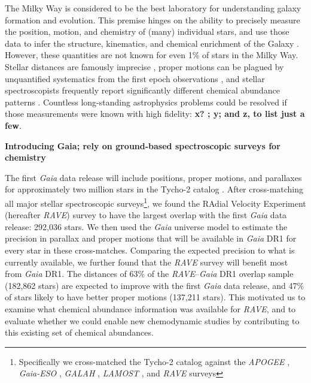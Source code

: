 \documentclass[preprint,trackchanges]{aastex}
\newcommand{\project}[1]{\textsl{#1}}
\newcommand{\acronym}[1]{{\small{#1}}}
\newcommand{\rave}{\project{\acronym{RAVE}}}
\newcommand{\stub}[1]{\textbf{#1}}
\begin{document}
The Milky Way is considered to be the best laboratory for understanding galaxy
formation and evolution.  This premise hinges on the ability to precisely measure 
the position, motion, and chemistry of (many) individual stars, and use those data 
to infer the structure, kinematics, and chemical enrichment of the Galaxy 
\citep[e.g.,][]{Deason_2011,Ness_2012,Ness_2013a,Ness_2013b,Casey_2012,Casey_2013,
Casey_2014a,Casey_2014b}.  %
However, these quantities are not known for even 1\% of stars in the Milky Way.  
Stellar distances are famously imprecise \citep[e.g.,][]{van_Leeuwen_2007,
Jofre_2015,Madler_2016}, proper motions can be plagued by unquantified systematics
from the first epoch observations \citep[e.g.,][]{Casey_Schlaufman_2015}, and 
stellar spectroscopists frequently report significantly different chemical 
abundance patterns \citep{Smiljanic_2014}.  Countless long-standing astrophysics
problems could be resolved if those measurements were known with high fidelity: 
\stub{x? \citep{someone}; y; and z, to list just a few}.


\stub{Introducing Gaia; rely on ground-based spectroscopic surveys for chemistry}

The first \project{Gaia} data release will include positions, proper motions, and 
parallaxes for approximately two million stars in the Tycho-2 \citep{Hog_2000} 
catalog \citep{Michalik_2015a,Michalik_2015b}.  After cross-matching all major 
stellar spectroscopic surveys\footnote{Specifically we cross-matched the Tycho-2
catalog against the \project{APOGEE} \citep{Zasowski_2013}, \project{Gaia-ESO} 
\citep{Gilmore_2012,Randich_2013}, \project{GALAH} \citep{DeSilva_2015},
\project{LAMOST} \citep{Cui_2012}, and \project{RAVE} \citep{Steinmetz_2006} 
surveys}, we found the RAdial Velocity Experiment (hereafter \rave) survey to 
have the largest overlap with the first \project{Gaia} data release: 292,036 
stars.  We then used the \project{Gaia} universe model \citep{Robin_2012} to 
estimate the precision in parallax and proper motions that will be available in 
\project{Gaia} DR1 for every star in these cross-matches.  Comparing the expected
precision to what is currently available, we further found that the \project{RAVE}
survey will benefit most from \project{Gaia} DR1.  The distances of 63\% of the 
\project{RAVE}--\project{Gaia} DR1 overlap sample (182,862 stars) are expected to
improve with the first \project{Gaia} data release, and 47\% of stars likely to
have better proper motions (137,211 stars).  This motivated us to examine what 
chemical abundance information was available for \rave, and to evaluate whether 
we could enable new chemodynamic studies by contributing to this existing set of
chemical abundances.
\end{document}
